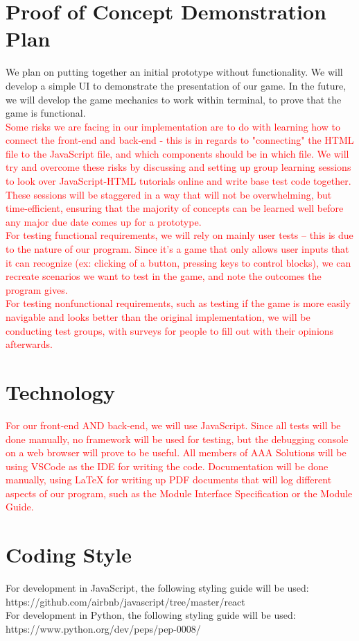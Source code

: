 \documentclass{article}
\begin{document}
\section{Proof of Concept Demonstration Plan}
We plan on putting together an initial prototype without functionality. We will develop a simple UI to demonstrate the presentation of our game. In the future, we will develop the game mechanics to work within terminal, to prove that the game is functional.\\
\textcolor{red}{Some risks we are facing in our implementation are to do with learning how to connect the front-end and back-end - this is in regards to "connecting" the HTML file to the JavaScript file, and which components should be in which file. We will try and overcome these risks by discussing and setting up group learning sessions to look over JavaScript-HTML tutorials online and write base test code together. These sessions will be staggered in a way that will not be overwhelming, but time-efficient, ensuring that the majority of concepts can be learned well before any major due date comes up for a prototype.
\\For testing functional requirements, we will rely on mainly user tests -- this is due to the nature of our program. Since it's a game that only allows user inputs that it can recognize (ex: clicking of a button, pressing keys to control blocks), we can recreate scenarios we want to test in the game, and note the outcomes the program gives.
\\For testing nonfunctional requirements, such as testing if the game is more easily navigable and looks better than the original implementation, we will be conducting test groups, with surveys for people to fill out with their opinions afterwards.
}

\section{Technology}
\textcolor{red}{For our front-end AND back-end, we will use JavaScript. Since all tests will be done manually, no framework will be used for testing, but the debugging console on a web browser will prove to be useful. All members of AAA Solutions will be using VSCode as the IDE for writing the code. Documentation will be done manually, using LaTeX for writing up PDF documents that will log different aspects of our program, such as the Module Interface Specification or the Module Guide.}

\section{Coding Style}
For development in JavaScript, the following styling guide will be used:\\
https://github.com/airbnb/javascript/tree/master/react \\
For development in Python, the following styling guide will be used:\\ 
https://www.python.org/dev/peps/pep-0008/ \\
\end{document}
